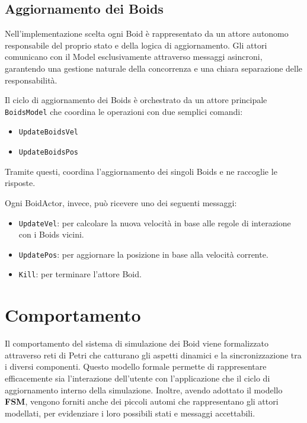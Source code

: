 \documentclass[a4paper,12pt]{report}
\begin{document}
    \section{Aggiornamento dei Boids}
        Nell'implementazione scelta ogni Boid è rappresentato da un attore autonomo responsabile del proprio stato e della logica di aggiornamento. Gli attori comunicano con il Model esclusivamente attraverso messaggi asincroni, garantendo una gestione naturale della concorrenza e una chiara separazione delle responsabilità.

        Il ciclo di aggiornamento dei Boids è orchestrato da un attore principale \texttt{BoidsModel} che coordina le operazioni con due semplici comandi:
        \begin{itemize}
            \item \texttt{UpdateBoidsVel}
            \item \texttt{UpdateBoidsPos}
        \end{itemize}
        Tramite questi, coordina l'aggiornamento dei singoli Boids e ne raccoglie le risposte.
        
        Ogni BoidActor, invece, può ricevere uno dei seguenti messaggi:
        \begin{itemize}
            \item \texttt{UpdateVel}: per calcolare la nuova velocità in base alle regole di interazione con i Boids vicini.
            \item \texttt{UpdatePos}: per aggiornare la posizione in base alla velocità corrente.
            \item \texttt{Kill}: per terminare l'attore Boid.
        \end{itemize}
        
\chapter{Comportamento}
    Il comportamento del sistema di simulazione dei Boid viene formalizzato attraverso reti di Petri che catturano gli aspetti dinamici e la sincronizzazione tra i diversi componenti. Questo modello formale permette di rappresentare efficacemente sia l'interazione dell'utente con l'applicazione che il ciclo di aggiornamento interno della simulazione.
    Inoltre, avendo adottato il modello \textbf{FSM}, vengono forniti anche dei piccoli automi che rappresentano gli attori modellati, per evidenziare i loro possibili stati e messaggi accettabili.
    
\end{document}
